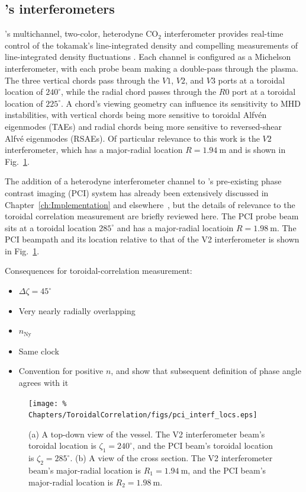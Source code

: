 \subsection{\diiid's interferometers}
\diiid's multichannel, two-color, heterodyne CO$_2$ interferometer
provides real-time control of the tokamak's line-integrated density
\cite{carlstrom_rsi88} and
compelling measurements of line-integrated density fluctuations
\cite{vanzeeland_ppcf05,pace_nf17}.
Each channel is configured as a Michelson interferometer,
with each probe beam making a double-pass through the plasma.
The three vertical chords pass through the $V1$, $V2$, and $V3$ ports
at a toroidal location of $240^{\circ}$, while
the radial chord passes through the $R0$ port
at a toroidal location of $225^{\circ}$.
A chord's viewing geometry can influence
its sensitivity to MHD instabilities,
with vertical chords being more sensitive to
toroidal Alfv\'{e}n eigenmodes (TAEs) and
radial chords being more sensitive to
reversed-shear Alfv\'{e} eigenmodes (RSAEs).
Of particular relevance to this work is the $V2$ interferometer,
which has a major-radial location $R = \SI{1.94}{\meter}$ and
is shown in Fig.~\ref{fig:ToroidalCorrelation:pci_interf_locs}.

The addition of a heterodyne interferometer channel
to \diiid's pre-existing phase contrast imaging (PCI) system
has already been extensively discussed in
Chapter~\ref{ch:Implementation} and
elsewhere~\cite{davis_rsi16}, but
the details of relevance to the toroidal correlation measurement
are briefly reviewed here.
The PCI probe beam sits at a toroidal location $285^{\circ}$ and
has a major-radial locatioin $R = \SI{1.98}{\meter}$.
The PCI beampath and its location
relative to that of the V2 interferometer
is shown in Fig.~\ref{fig:ToroidalCorrelation:pci_interf_locs}.

Consequences for toroidal-correlation measurement:
\begin{itemize}
  \item $\Delta \zeta = 45^{\circ}$
  \item Very nearly radially overlapping
  \item $n_{\text{Ny}}$
  \item Same clock
  \item Convention for positive $n$, and
    show that subsequent definition of phase angle agrees with it
\end{itemize}

\begin{figure}
  \centering
  \texttt{[image: \%
    Chapters/ToroidalCorrelation/figs/pci\_interf\_locs.eps]}
  \caption[Beam locations of the V2 and PCI interferometers on \diiid]{%
    (a) A top-down view of the \diiid\space vessel.
    The V2 interferometer beam's toroidal location is $\zeta_1 = 240^{\circ}$,
    and the PCI beam's toroidal location is $\zeta_2 = 285^{\circ}$.
    (b) A view of the \diiid\space cross section.
    The V2 interferometer beam's
    major-radial location is $R_1 = \SI{1.94}{\meter}$, and
    the PCI beam's major-radial location is $R_2 = \SI{1.98}{\meter}$.}
\label{fig:ToroidalCorrelation:pci_interf_locs}
\end{figure}


